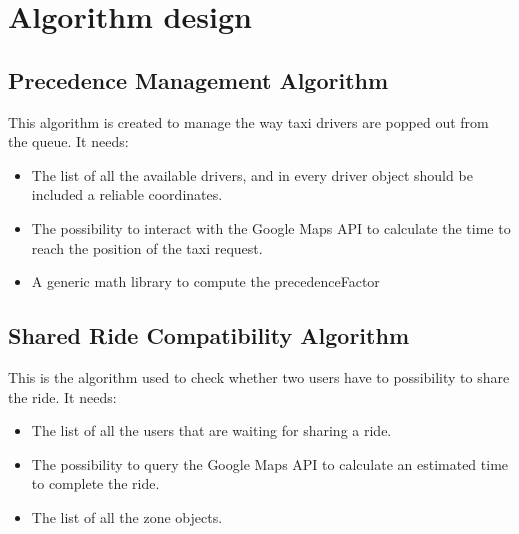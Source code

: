 

\section{Algorithm design} %
\label{sec:algorithm_design}


\subsection{Precedence Management Algorithm} %
\label{sub:first_algorithm}
This algorithm is created to manage the way taxi drivers are popped out from the queue.
It needs:

\begin{itemize}
	\item The list of all the available drivers, and in every driver object should be included a reliable coordinates.
	\item The possibility to interact with the Google Maps API to calculate the time to reach the position of the taxi request.
	\item A generic math library to compute the precedenceFactor
\end{itemize}







\subsection{Shared Ride Compatibility Algorithm} %
\label{sub:second_algorithm}
This is the algorithm used to check whether two users have to possibility to share the ride.
It needs:
\begin{itemize}
	\item The list of all the users that are waiting for sharing a ride.
	\item The possibility to query the Google Maps API to calculate an estimated time to complete the ride.
	\item The list of all the zone objects.
\end{itemize}

